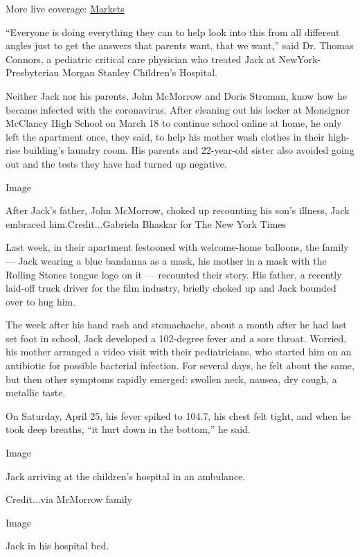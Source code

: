 More live coverage:
\href{https://www.nytimes.com/live/2020/08/07/business/stock-market-today-coronavirus?action=click\&pgtype=Article\&state=default\&region=MAIN_CONTENT_1\&context=storylines_live_updates}{Markets}

``Everyone is doing everything they can to help look into this from all
different angles just to get the answers that parents want, that we
want,'' said Dr. Thomas Connors, a pediatric critical care physician who
treated Jack at NewYork-Presbyterian Morgan Stanley Children's Hospital.

Neither Jack nor his parents, John McMorrow and Doris Stroman, know how
he became infected with the coronavirus. After cleaning out his locker
at Monsignor McClancy High School on March 18 to continue school online
at home, he only left the apartment once, they said, to help his mother
wash clothes in their high-rise building's laundry room. His parents and
22-year-old sister also avoided going out and the tests they have had
turned up negative.

Image

After Jack's father, John McMorrow, choked up recounting his son's
illness, Jack embraced him.Credit...Gabriela Bhaskar for The New York
Times

Last week, in their apartment festooned with welcome-home balloons, the
family --- Jack wearing a blue bandanna as a mask, his mother in a mask
with the Rolling Stones tongue logo on it --- recounted their story. His
father, a recently laid-off truck driver for the film industry, briefly
choked up and Jack bounded over to hug him.

The week after his hand rash and stomachache, about a month after he had
last set foot in school, Jack developed a 102-degree fever and a sore
throat. Worried, his mother arranged a video visit with their
pediatricians, who started him on an antibiotic for possible bacterial
infection. For several days, he felt about the same, but then other
symptoms rapidly emerged: swollen neck, nausea, dry cough, a metallic
taste.

On Saturday, April 25, his fever spiked to 104.7, his chest felt tight,
and when he took deep breaths, ``it hurt down in the bottom,'' he said.

Image

Jack arriving at the children's hospital in an ambulance.

Credit...via McMorrow family

Image

Jack in his hospital bed.

